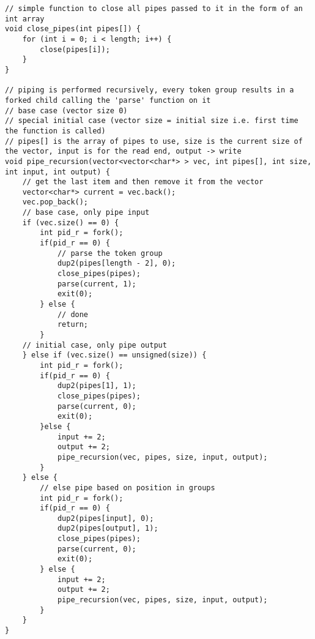 \documentclass[12pt,letter,titlepage]{article}
\begin{document}
{{{{{\begin{verbatim}
// simple function to close all pipes passed to it in the form of an int array
void close_pipes(int pipes[]) {
	for (int i = 0; i < length; i++) {
		close(pipes[i]);
	}
}

// piping is performed recursively, every token group results in a forked child calling the 'parse' function on it
// base case (vector size 0)
// special initial case (vector size = initial size i.e. first time the function is called)
// pipes[] is the array of pipes to use, size is the current size of the vector, input is for the read end, output -> write
void pipe_recursion(vector<vector<char*> > vec, int pipes[], int size, int input, int output) {
	// get the last item and then remove it from the vector
	vector<char*> current = vec.back();
	vec.pop_back();
	// base case, only pipe input
	if (vec.size() == 0) {
		int pid_r = fork();
		if(pid_r == 0) {
			// parse the token group
			dup2(pipes[length - 2], 0);
			close_pipes(pipes);
			parse(current, 1);
			exit(0);
		} else {
			// done
			return;
		}
	// initial case, only pipe output
	} else if (vec.size() == unsigned(size)) {
		int pid_r = fork();
		if(pid_r == 0) {
			dup2(pipes[1], 1);
			close_pipes(pipes);
			parse(current, 0);
			exit(0);
		}else {
			input += 2;
			output += 2;
			pipe_recursion(vec, pipes, size, input, output);
		}
	} else {
		// else pipe based on position in groups
		int pid_r = fork();
		if(pid_r == 0) {
			dup2(pipes[input], 0);
			dup2(pipes[output], 1);
			close_pipes(pipes);
			parse(current, 0);
			exit(0);
		} else {
			input += 2;
			output += 2;
			pipe_recursion(vec, pipes, size, input, output);
		}
	}
}


\end{verbatim}}}}}}
\end{document}
